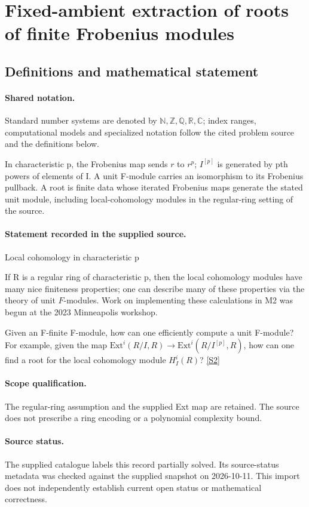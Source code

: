 \documentclass[11pt]{article}
\newcommand{\sref}[2]{\hyperlink{source:#1:#2}{[S#2]}}
\begin{document}
\section{Fixed-ambient extraction of roots of finite Frobenius modules}\label{statement}

\subsection{Definitions and mathematical statement}

\paragraph{Shared notation.}Standard number systems are denoted by $\mathbb N,\mathbb Z,\mathbb Q,\mathbb R,\mathbb C$; index ranges, computational models and specialized notation follow the cited problem source and the definitions below.


In characteristic p, the Frobenius map sends $r$ to $r^p$; $I^{[p]}$ is generated by pth powers of elements of I. A unit F-module carries an isomorphism to its Frobenius pullback. A root is finite data whose iterated Frobenius maps generate the stated unit module, including local-cohomology modules in the regular-ring setting of the source.
\paragraph{Statement recorded in the supplied source.}
Local cohomology in characteristic p

If R is a regular ring of characteristic p, then the local cohomology modules have many nice finiteness properties; one can describe many of these properties via the theory of unit $F$-modules. Work on implementing these calculations in M2 was begun at the 2023 Minneapolis workshop.

Given an F-finite F-module, how can one efficiently compute a unit F-module? For example, given the map $\mathrm{Ext}^i(R/I,R)\to \mathrm{Ext}^i(R/I^{[p]},R)$, how can one find a root for the local cohomology module $H^i_I(R)$? \sref{statement}{2}
\paragraph{Scope qualification.}
The regular-ring assumption and the supplied Ext map are retained. The source does not prescribe a ring encoding or a polynomial complexity bound.
\paragraph{Source status.}
The supplied catalogue labels this record partially solved. Its source-status metadata was checked against the supplied snapshot on 2026-10-11. This import does not independently establish current open status or mathematical correctness.
\end{document}
